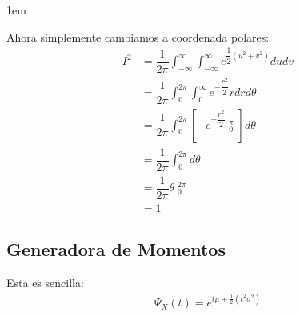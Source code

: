 \documentclass[12pt, fleqn]{report}                             %
\newenvironment{SmallIndentation}[1][0.75em]                    %
        {\begin{adjustwidth}{#1}{}\begin{footnotesize}}             %
        {\end{footnotesize}\end{adjustwidth}}                       %
\theoremstyle{break}                                            %
\newcommand{\Brackets}[1]       {\left[ #1 \right]}             %
\DeclareMathOperator \Evaluate  {\Big|}                         %
\begin{document}
\begin{SmallIndentation}[1em]
                    Ahora simplemente cambiamos a coordenada polares:
                    \begin{align}
                        I^2
                            &= \dfrac{1}{2\pi} 
                                \int_{-\infty}^\infty 
                                    \int_{-\infty}^\infty e^{\dfrac{1}{2}(u^2 + v^2)} du dv             \\
                            &= \dfrac{1}{2\pi} 
                                \int_0^{2\pi}
                                    \int_0^\infty e^{-\dfrac{r^2}{2}} r dr d\theta                      \\
                            &= \dfrac{1}{2\pi} 
                                \int_0^{2\pi}
                                    \Brackets{-e^{-\dfrac{r^2}{2}} \Evaluate_0^\pi } d\theta            \\
                            &= \dfrac{1}{2\pi} \int_0^{2\pi} d\theta                                    \\
                            &= \dfrac{1}{2\pi} \theta \Evaluate_0^{2\pi}                                \\
                            &= 1
                    \end{align}

                \end{SmallIndentation}
                    

            \clearpage
            \subsection{Generadora de Momentos}

                Esta es sencilla:
                \begin{align*}
                    \Psi_X(t) = e^{t\mu + \frac{1}{2}(t^2\sigma^2)}
                \end{align*}
\end{document}
